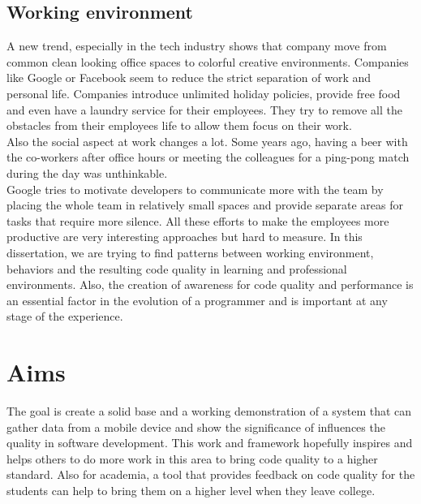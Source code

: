 \subsection{Working environment}
A new trend, especially in the tech industry shows that company move from common clean looking office spaces to colorful creative environments. Companies like Google or Facebook seem to reduce the strict separation of work and personal life. Companies introduce unlimited holiday policies, provide free food and even have a laundry service for their employees. They try to remove all the obstacles from their employees life to allow them focus on their work.\\
Also the social aspect at work changes a lot. Some years ago, having a beer with the co-workers after office hours or meeting the colleagues for a ping-pong match during the day was unthinkable.\\
Google tries to motivate developers to communicate more with the team by placing the whole team in relatively small spaces and provide separate areas for tasks that require more silence. 
All these efforts to make the employees more productive are very interesting approaches but hard to measure. 
\bigbreak
In this dissertation, we are trying to find patterns between working environment, behaviors and the resulting code quality in learning and professional environments. Also, the creation of awareness for code quality and performance is an essential factor in the evolution of a programmer and is important at any stage of the experience. 

\section{Aims}
The goal is create a solid base and a working demonstration of a system that can gather data from a mobile device and show the significance of influences the quality in software development. 
This work and framework hopefully inspires and helps others to do more work in this area to bring code quality to a higher standard. 
Also for academia, a tool that provides feedback on code quality for the students can help to bring them on a higher level when they leave college. 

